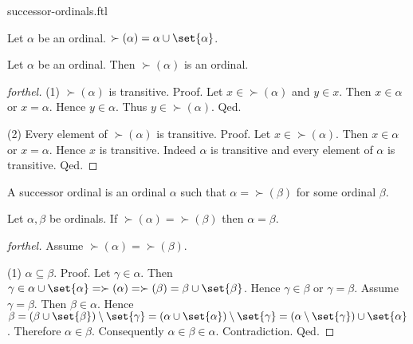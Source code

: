 \documentclass{naproche-library}
\begin{document}
\begin{smodule}[title=Successor Ordinals]{successor-ordinals.ftl}

\begin{definition}[forthel,id=SET_THEORY_02_8166925802668032]
  Let $\alpha$ be an ordinal.
  $\succ(\alpha) = \alpha \cup \set{\alpha}$.
\end{definition}

\begin{proposition}[forthel,id=SET_THEORY_02_1624410224066560]
  Let $\alpha$ be an ordinal.
  Then $\succ(\alpha)$ is an ordinal.
\end{proposition}
\begin{proof}[forthel]
  (1) $\succ(\alpha)$ is transitive. \newline
  Proof.
    Let $x \in \succ(\alpha)$ and $y \in x$.
    Then $x \in \alpha$ or $x = \alpha$.
    Hence $y \in \alpha$.
    Thus $y \in \succ(\alpha)$.
  Qed.

  (2) Every element of $\succ(\alpha)$ is transitive. \newline
  Proof.
    Let $x \in \succ(\alpha)$.
    Then $x \in \alpha$ or $x = \alpha$.
    Hence $x$ is transitive.
    Indeed $\alpha$ is transitive and every element of $\alpha$ is transitive.
  Qed.
\end{proof}

\begin{definition}[forthel,id=SET_THEORY_02_7129712109289472]
  A successor ordinal is an ordinal $\alpha$ such that $\alpha = \succ(\beta)$ for some ordinal $\beta$.
\end{definition}

\begin{proposition}[forthel,id=SET_THEORY_02_8651096763400192]
  Let $\alpha, \beta$ be ordinals.
  If $\succ(\alpha) = \succ(\beta)$ then $\alpha = \beta$.
\end{proposition}
\begin{proof}[forthel]
  Assume $\succ(\alpha) = \succ(\beta)$.

  (1) $\alpha \subseteq \beta$. \newline
  Proof.
    Let $\gamma \in \alpha$.
    Then $\gamma \in \alpha \cup \set{\alpha}
      = \succ(\alpha)
      = \succ(\beta)
      = \beta \cup \set{\beta}$.
    Hence $\gamma \in \beta$ or $\gamma = \beta$.
    Assume $\gamma = \beta$.
    Then $\beta \in \alpha$.
    Hence $\beta
      = (\beta \cup \set{\beta}) \setminus \set{\gamma}
      = (\alpha \cup \set{\alpha}) \setminus \set{\gamma}
      = (\alpha \setminus \set{\gamma}) \cup \set{\alpha}$.
    Therefore $\alpha \in \beta$.
    Consequently $\alpha \in \beta \in \alpha$.
    Contradiction.
  Qed.


\end{proof}
\end{smodule}
\end{document}

